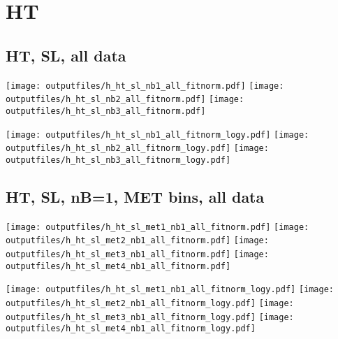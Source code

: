 \documentclass[11pt]{article}
\begin{document}
   \section{HT}

    \subsection{ HT, SL, all data}

    \noindent
     \texttt{[image: outputfiles/h\_ht\_sl\_nb1\_all\_fitnorm.pdf]}
     \texttt{[image: outputfiles/h\_ht\_sl\_nb2\_all\_fitnorm.pdf]}
     \texttt{[image: outputfiles/h\_ht\_sl\_nb3\_all\_fitnorm.pdf]}

    \noindent
     \texttt{[image: outputfiles/h\_ht\_sl\_nb1\_all\_fitnorm\_logy.pdf]}
     \texttt{[image: outputfiles/h\_ht\_sl\_nb2\_all\_fitnorm\_logy.pdf]}
     \texttt{[image: outputfiles/h\_ht\_sl\_nb3\_all\_fitnorm\_logy.pdf]}


     \subsection{ HT, SL, nB=1, MET bins, all data}

    \noindent
     \texttt{[image: outputfiles/h\_ht\_sl\_met1\_nb1\_all\_fitnorm.pdf]}
     \texttt{[image: outputfiles/h\_ht\_sl\_met2\_nb1\_all\_fitnorm.pdf]}
     \texttt{[image: outputfiles/h\_ht\_sl\_met3\_nb1\_all\_fitnorm.pdf]}
     \texttt{[image: outputfiles/h\_ht\_sl\_met4\_nb1\_all\_fitnorm.pdf]}

    \noindent
     \texttt{[image: outputfiles/h\_ht\_sl\_met1\_nb1\_all\_fitnorm\_logy.pdf]}
     \texttt{[image: outputfiles/h\_ht\_sl\_met2\_nb1\_all\_fitnorm\_logy.pdf]}
     \texttt{[image: outputfiles/h\_ht\_sl\_met3\_nb1\_all\_fitnorm\_logy.pdf]}
     \texttt{[image: outputfiles/h\_ht\_sl\_met4\_nb1\_all\_fitnorm\_logy.pdf]}

   \clearpage
\end{document}

